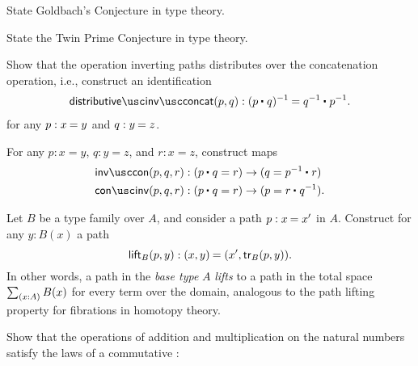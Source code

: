 \begin{exercises}
\item
  \begin{subexenum}
  \item State Goldbach's Conjecture in type theory.
  \item State the Twin Prime Conjecture in type theory.
  \end{subexenum}
\item \label{ex:inv_assoc}Show that the operation inverting paths distributes over the concatenation operation, i.e., construct an identification
  \begin{align*}
    \distributiveinvconcat(p,q):\id{(\ct{p}{q})^{-1}}{\ct{q^{-1}}{p^{-1}}}.
  \end{align*}
  for any $p:\id{x}{y}$ and $q:\id{y}{z}$.
\item \label{ex:inv_con}For any $p:x=y$, $q:y=z$, and $r:x=z$, construct maps
  \begin{align*}
    \invcon(p,q,r) & : (\ct{p}{q}=r)\to (q=\ct{p^{-1}}{r}) \\
    \coninv(p,q,r) & : (\ct{p}{q}=r)\to (p=\ct{r}{q^{-1}}).
  \end{align*}
\item Let $B$ be a type family over $A$, and consider a path $p:\id{x}{x'}$ in $A$. Construct for any $y:B(x)$ a path
  \begin{equation*}
    \lift_B(p,y) : \id{(x,y)}{(x',\tr_B(p,y))}.
  \end{equation*}
  In other words, a path in the \emph{base type} $A$ \emph{lifts} to a path in the total space $\sm{x:A}B(x)$ for every term over the domain, analogous to the path lifting property for fibrations in homotopy theory.
\item \label{ex:semi-ring-laws-N}Show that the operations of addition and multiplication on the natural numbers satisfy the laws of a commutative
  :%

\end{exercises}
